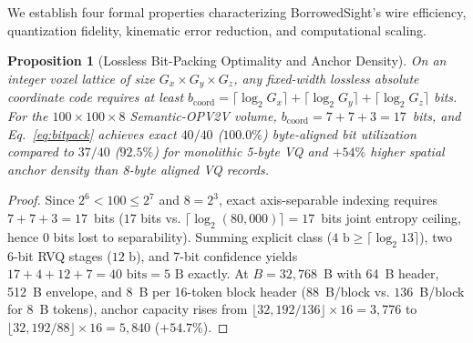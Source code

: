 \documentclass[journal]{IEEEtran}
\newtheorem{proposition}{Proposition}
\begin{document}
We establish four formal properties characterizing BorrowedSight's wire efficiency, quantization fidelity, kinematic error reduction, and computational scaling.

\begin{proposition}[Lossless Bit-Packing Optimality and Anchor Density]
On an integer voxel lattice of size $G_x \times G_y \times G_z$, any fixed-width lossless absolute coordinate code requires at least $b_{\mathrm{coord}} = \lceil \log_2 G_x \rceil + \lceil \log_2 G_y \rceil + \lceil \log_2 G_z \rceil$ bits. For the $100\times 100\times 8$ Semantic-OPV2V volume, $b_{\mathrm{coord}} = 7 + 7 + 3 = 17$~bits, and Eq.~\eqref{eq:bitpack} achieves exact $40/40$ ($100.0\%$) byte-aligned bit utilization compared to $37/40$ ($92.5\%$) for monolithic 5-byte VQ and $+54\%$ higher spatial anchor density than 8-byte aligned VQ records.
\end{proposition}
\begin{proof}
Since $2^6 < 100 \le 2^7$ and $8 = 2^3$, exact axis-separable indexing requires $7+7+3 = 17$~bits ($17$ bits vs. $\lceil \log_2(80{,}000)\rceil = 17$~bits joint entropy ceiling, hence 0 bits lost to separability). Summing explicit class ($4\text{ b} \ge \lceil\log_2 13\rceil$), two 6-bit RVQ stages ($12\text{ b}$), and 7-bit confidence yields $17 + 4 + 12 + 7 = 40\text{ bits} = 5\text{ B}$ exactly. At $B = 32{,}768$~B with 64~B header, 512~B envelope, and 8~B per 16-token block header ($88$~B/block vs. $136$~B/block for 8~B tokens), anchor capacity rises from $\lfloor 32{,}192/136\rfloor \times 16 = 3{,}776$ to $\lfloor 32{,}192/88\rfloor \times 16 = 5{,}840$ ($+54.7\%$).
\end{proof}
\end{document}

